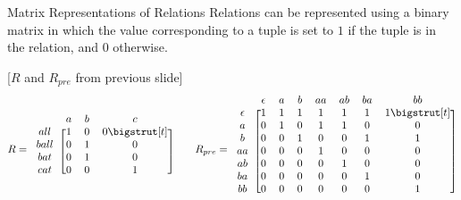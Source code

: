 \begin{slide}[bm=,toc=]{Matrix Representations of Relations}
Relations can be represented using a binary matrix in which the
value corresponding to a tuple is set to $1$ if the tuple is
in the relation, and $0$ otherwise.
\begin{ex}{}[$R$ and $R_{pre}$ from previous slide]
\[
R = 
\begin{blockarray}{cccc}
\begin{block}{cccc}
& a & b & c \\
\end{block}
\begin{block}{c[ccc]}
all  & 1 & 0 & 0 \bigstrut[t] \\
ball & 0 & 1 & 0 \\
bat  & 0 & 1 & 0 \\
cat  & 0 & 0 & 1 \\
\end{block}
\end{blockarray}
\qquad R_{pre} =
\begin{blockarray}{cccccccc}
\begin{block}{cccccccc}
 & \epsilon & a & b & aa & ab & ba & bb \\
\end{block}
\begin{block}{c[ccccccc]}
\epsilon & 1  & 1 & 1 & 1  & 1  & 1  & 1\bigstrut[t] \\
a  & 0& 1 & 0 & 1  & 1  & 0  & 0 \\
b  & 0& 0 & 1 & 0  & 0  & 1  & 1 \\
aa & 0& 0 & 0 & 1  & 0  & 0  & 0 \\
ab & 0& 0 & 0 & 0  & 1  & 0  & 0 \\
ba & 0& 0 & 0 & 0  & 0  & 1  & 0 \\
bb & 0& 0 & 0 & 0  & 0  & 0  & 1 \\
\end{block}
\end{blockarray}
\]
\end{ex}
\end{slide}

